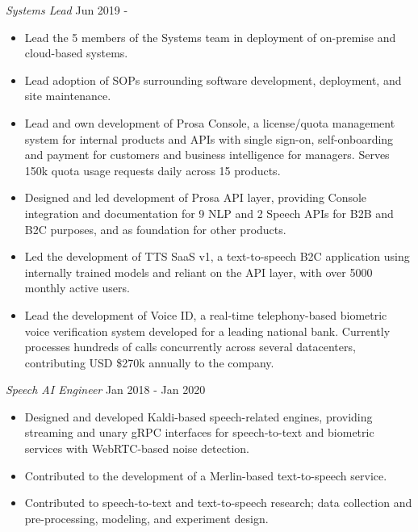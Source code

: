 \documentclass{article}
\begin{document}
\emph{Systems Lead} \hfill Jun 2019 -\\
\vspace{-3mm}
\begin{itemize}[align=left, left=0pt..1em, itemsep=-2pt]
  \item Lead the 5 members of the Systems team in deployment of on-premise
    and cloud-based systems.
  \item Lead adoption of SOPs surrounding software development,
    deployment, and site maintenance.
  \item Lead and own development of Prosa Console, a license/quota management
    system for internal products and APIs with single sign-on, self-onboarding
    and payment for customers and business intelligence for managers. Serves
    150k quota usage requests daily across 15 products.
  \item Designed and led development of Prosa API layer, providing Console
    integration and documentation for 9 NLP and 2 Speech APIs for B2B and B2C
    purposes, and as foundation for other products.
  \item Led the development of TTS SaaS v1, a text-to-speech B2C application
    using internally trained models and reliant on the API layer, with over
    5000 monthly active users.
  \item Lead the development of Voice ID, a real-time telephony-based
    biometric voice verification system developed for a leading national bank.
    Currently processes hundreds of calls concurrently across several
    datacenters, contributing USD \$270k annually to the company.
\end{itemize}
\vspace{-2mm}

\emph{Speech AI Engineer} \hfill Jan 2018 - Jan 2020\\
\vspace{-3mm}
\begin{itemize}[align=left, left=0pt..1em, itemsep=-2pt]
  \item Designed and developed Kaldi-based speech-related engines, providing
    streaming and unary gRPC interfaces for speech-to-text and biometric
    services with WebRTC-based noise detection.
  \item Contributed to the development of a Merlin-based text-to-speech service.
  \item Contributed to speech-to-text and text-to-speech research; data collection
    and pre-processing, modeling, and experiment design.
\end{itemize}
\vspace{-1mm}
\end{document}
